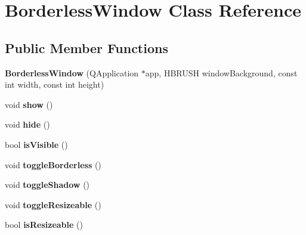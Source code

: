 \hypertarget{class_borderless_window}{}\section{Borderless\+Window Class Reference}
\label{class_borderless_window}
\subsection*{Public Member Functions}
\begin{DoxyCompactItemize}
\item 
\hypertarget{class_borderless_window_afb905e70408ef9ee0bf8cac6ad601dcb}{}{\bfseries Borderless\+Window} (Q\+Application $\ast$app, H\+B\+R\+U\+S\+H window\+Background, const int width, const int height)\label{class_borderless_window_afb905e70408ef9ee0bf8cac6ad601dcb}

\item 
\hypertarget{class_borderless_window_a3aa62557d68e481001499db15f9d0301}{}void {\bfseries show} ()\label{class_borderless_window_a3aa62557d68e481001499db15f9d0301}

\item 
\hypertarget{class_borderless_window_aa2686cfb4a38db581d3ed12763b96e99}{}void {\bfseries hide} ()\label{class_borderless_window_aa2686cfb4a38db581d3ed12763b96e99}

\item 
\hypertarget{class_borderless_window_a92eee138f9367fa4588c01cd5d76c574}{}bool {\bfseries is\+Visible} ()\label{class_borderless_window_a92eee138f9367fa4588c01cd5d76c574}

\item 
\hypertarget{class_borderless_window_a05c1a418f92091bf2cc3c1b6be9dd508}{}void {\bfseries toggle\+Borderless} ()\label{class_borderless_window_a05c1a418f92091bf2cc3c1b6be9dd508}

\item 
\hypertarget{class_borderless_window_a32fd003f8b26ee6c33af334e5c6e8c0d}{}void {\bfseries toggle\+Shadow} ()\label{class_borderless_window_a32fd003f8b26ee6c33af334e5c6e8c0d}

\item 
\hypertarget{class_borderless_window_ae88611ce68d4cedab37af61a0b12af4e}{}void {\bfseries toggle\+Resizeable} ()\label{class_borderless_window_ae88611ce68d4cedab37af61a0b12af4e}

\item 
\hypertarget{class_borderless_window_a5d0ff82ba4399db588f314c1afb79798}{}bool {\bfseries is\+Resizeable} ()\label{class_borderless_window_a5d0ff82ba4399db588f314c1afb79798}


\end{DoxyCompactItemize}
